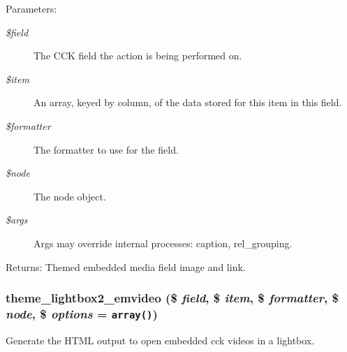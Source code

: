 \begin{Desc}
\item[Parameters:]
\begin{description}
\item[{\em \$field}]The CCK field the action is being performed on. \item[{\em \$item}]An array, keyed by column, of the data stored for this item in this field. \item[{\em \$formatter}]The formatter to use for the field. \item[{\em \$node}]The node object. \item[{\em \$args}]Args may override internal processes: caption, rel\_\-grouping. \end{description}
\end{Desc}
\begin{Desc}
\item[Returns:]Themed embedded media field image and link. \end{Desc}
\hypertarget{lightbox2_8formatter_8inc_55a97c8d94f5b37a32eb1bf79c153533}{
\subsubsection[{theme\_\-lightbox2\_\-emvideo}]{\setlength{\rightskip}{0pt plus 5cm}theme\_\-lightbox2\_\-emvideo (\$ {\em field}, \/  \$ {\em item}, \/  \$ {\em formatter}, \/  \$ {\em node}, \/  \$ {\em options} = {\tt array()})}}
\label{lightbox2_8formatter_8inc_55a97c8d94f5b37a32eb1bf79c153533}


Generate the HTML output to open embedded cck videos in a lightbox.

